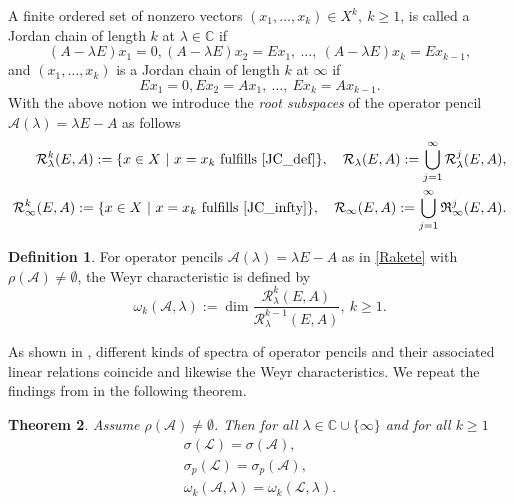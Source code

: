 \documentclass{birkjour}
\newtheorem{thm}{Theorem}[section]
\theoremstyle{definition}
\newtheorem{defn}[thm]{Definition}
\theoremstyle{remark}
\numberwithin{equation}{section}
\newcommand{\C}{\mathbb C}
\newcommand{\Rf}{\mathfrak{R}}
\newcommand{\A}{\mathcal A}
\newcommand{\Rr}{\mathcal R}
\newcommand{\Ll}{\mathcal L}
\renewcommand{\geq}{\geqslant}
\begin{document}
A finite ordered set of nonzero vectors  $(x_1, \ldots, x_k) \in X^k, \ k\geq 1$, is called a Jordan chain of length $k$ at $\lambda \in \C$ if 
\begin{equation}\label{JC_def}
    (A-\lambda E)x_1=0, (A-\lambda E)x_2=E x_1, \ \ldots,\ (A-\lambda E)x_k=E x_{k-1},
\end{equation}
and $(x_1,\ldots,x_k)$ is a Jordan chain of length $k$ at $\infty$ if 
\begin{equation}\label{JC_infty}
E x_1 =0, E x_2 = Ax_1,\ \ldots,\ Ex_k = Ax_{k-1}.
\end{equation}
With the above notion we introduce the \emph{root subspaces} of the operator pencil $\A(\lambda)=\lambda E-A$ as follows
\begin{align*}
\Rr_\lambda^k(E,A):=\{x\in X~|~ \text{$x=x_k$ fulfills \eqref{JC_def}}\},\quad \Rr_\lambda(E,A):=\bigcup_{j=1}^\infty\Rr^j_\lambda(E,A),\\
\Rr_\infty^k(E,A):=\{x\in X~|~ \text{$x=x_k$ fulfills \eqref{JC_infty}}\},\quad  \Rr_\infty(E,A):=\bigcup_{j=1}^\infty\Rf^j_\infty(E,A).
\end{align*}

\begin{defn}
For operator pencils $
\A(\lambda)= \lambda E-A
$   as in \eqref{Rakete} with
$\rho(\A) \neq \emptyset$,
the Weyr characteristic is defined by
$$
\omega_k(\A,\lambda):= \dim \frac{\Rr_{\lambda}^ k(E,A)}{\Rr_{\lambda}^ {k-1}(E,A)}, \ k\geq1.
$$ 
\end{defn}

As shown in \cite{GT21}, different kinds of spectra of operator pencils and their associated linear relations coincide and likewise the Weyr characteristics.  
We repeat the findings from  \cite{GT21} in the following 
theorem.
\begin{thm}\label{weyr}
Assume $\rho(\A)\neq \emptyset$.
Then for all $\lambda\in \C\cup \{\infty\}$ and for all $k\geq 1$
$$
\begin{array}{c}
     \sigma(\Ll)=\sigma(\A), \\[1ex]
     \sigma_p(\Ll)=\sigma_p(\A),\\[1ex]
     \omega_k(\A,\lambda)= \omega_k(\Ll,\lambda).
\end{array}
$$
\end{thm}
    
\end{document}
